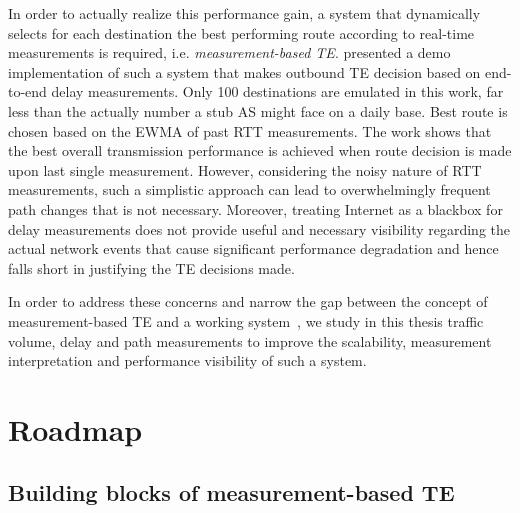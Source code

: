 In order to actually realize this performance gain, a system that dynamically selects for each destination the best performing route according to real-time measurements is required, i.e. \textit{measurement-based TE}.
\citet{Akella2008} presented a demo implementation of such a system that makes outbound TE decision based on end-to-end delay measurements. Only 100 destinations are emulated in this work, far less than the actually number a stub AS might face on a daily base. Best route is chosen based on the \ac{EWMA} of past \acf{RTT} measurements. The work shows that the best overall transmission performance is achieved when route decision is made upon last single measurement. However, considering the noisy nature of \ac{RTT} measurements, such a simplistic approach can lead to overwhelmingly frequent path changes that is not necessary. Moreover, treating Internet as a blackbox for delay measurements does not provide useful and necessary visibility regarding the actual network events that cause significant performance degradation and hence falls short in justifying the TE decisions made. 

In order to address these concerns and narrow the gap between the concept of measurement-based TE and a working system~\cite{b6}, we 
study in this thesis traffic volume, delay and path measurements to improve the scalability, measurement interpretation and performance visibility of such a system.


\section{Roadmap}
\subsection{Building blocks of measurement-based TE}

